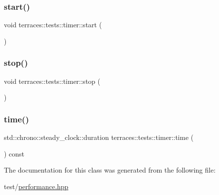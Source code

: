 \mbox{\label{classterraces_1_1tests_1_1timer_a43b0d8af26380d68962b4d583d98a2e7}} 
\subsubsection{\texorpdfstring{start()}{start()}}
{\footnotesize\ttfamily void terraces\+::tests\+::timer\+::start (\begin{DoxyParamCaption}{ }\end{DoxyParamCaption})\hspace{0.3cm}{\ttfamily [inline]}}

\mbox{\label{classterraces_1_1tests_1_1timer_a239a44259df8bc77499fe8431f9f4825}} 
\subsubsection{\texorpdfstring{stop()}{stop()}}
{\footnotesize\ttfamily void terraces\+::tests\+::timer\+::stop (\begin{DoxyParamCaption}{ }\end{DoxyParamCaption})\hspace{0.3cm}{\ttfamily [inline]}}

\mbox{\label{classterraces_1_1tests_1_1timer_ab3c8672bcc529d9e28fe005474e9603c}} 
\subsubsection{\texorpdfstring{time()}{time()}}
{\footnotesize\ttfamily std\+::chrono\+::steady\+\_\+clock\+::duration terraces\+::tests\+::timer\+::time (\begin{DoxyParamCaption}{ }\end{DoxyParamCaption}) const\hspace{0.3cm}{\ttfamily [inline]}}



The documentation for this class was generated from the following file\+:\begin{DoxyCompactItemize}
\item 
test/\hyperlink{performance_8hpp}{performance.\+hpp}\end{DoxyCompactItemize}

